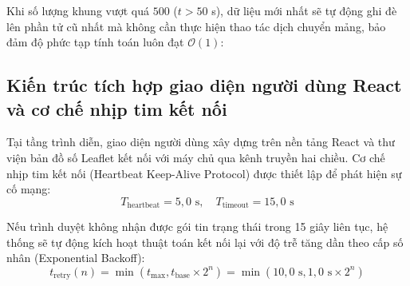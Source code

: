 Khi số lượng khung vượt quá $500$ ($t > 50$ s), dữ liệu mới nhất sẽ tự động ghi đè lên phần tử cũ nhất mà không cần thực hiện thao tác dịch chuyển mảng, bảo đảm độ phức tạp tính toán luôn đạt $\mathcal{O}(1)$:

\begin{table}[H]
\centering
\caption{So sánh hiệu năng giữa mảng động tự co giãn và bộ đệm vòng xoay cố định}
\label{tab:ring-buffer-vs-dynamic-array}
\end{table}

\subsection{Kiến trúc tích hợp giao diện người dùng React và cơ chế nhịp tim kết nối}

\hspace{0.5cm} Tại tầng trình diễn, giao diện người dùng xây dựng trên nền tảng React và thư viện bản đồ số Leaflet kết nối với máy chủ qua kênh truyền hai chiều. Cơ chế nhịp tim kết nối (Heartbeat Keep-Alive Protocol) được thiết lập để phát hiện sự cố mạng:
\begin{equation}
T_{\text{heartbeat}} = 5{,}0\text{ s}, \quad T_{\text{timeout}} = 15{,}0\text{ s}
\label{eq:heartbeat-timeout-formula}
\end{equation}

Nếu trình duyệt không nhận được gói tin trạng thái trong 15 giây liên tục, hệ thống sẽ tự động kích hoạt thuật toán kết nối lại với độ trễ tăng dần theo cấp số nhân (Exponential Backoff):
\begin{equation}
t_{\text{retry}}(n) = \min(t_{\max}, t_{\text{base}} \times 2^n) = \min(10{,}0\text{ s}, 1{,}0\text{ s} \times 2^n)
\label{eq:exponential-backoff-retry}
\end{equation}

